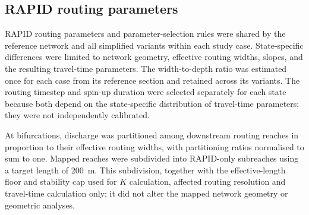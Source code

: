 \subsection{RAPID routing parameters}
\label{app:routing_parameters}

RAPID routing parameters and parameter-selection rules were shared by the reference network and all simplified variants within each study case. State-specific differences were limited to network geometry, effective routing widths, slopes, and the resulting travel-time parameters. The width-to-depth ratio was estimated once for each case from its reference section and retained across its variants. The routing timestep and spin-up duration were selected separately for each state because both depend on the state-specific distribution of travel-time parameters; they were not independently calibrated.

At bifurcations, discharge was partitioned among downstream routing reaches in proportion to their effective routing widths, with partitioning ratios normalised to sum to one. Mapped reaches were subdivided into RAPID-only subreaches using a target length of 200~m. This subdivision, together with the effective-length floor and stability cap used for $K$ calculation, affected routing resolution and travel-time calculation only; it did not alter the mapped network geometry or geometric analyses.


